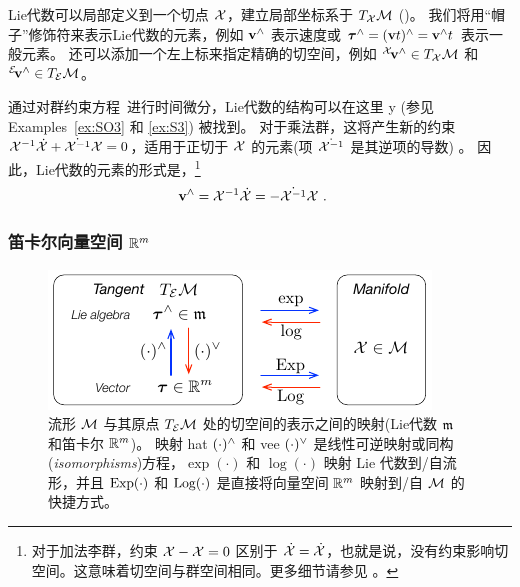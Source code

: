 Lie代数可以局部定义到一个切点 $\mathcal{X}$，建立局部坐标系于 $T_{\mathcal{X}}{\mathcal{M}}$
()。
我们将用“帽子”修饰符来表示Lie代数的元素，例如 ${\bf v}^\wedge$ 表示速度或 ${\bm \tau}^\wedge=({\bf v} t)^\wedge={\bf v}^\wedge t$ 表示一般元素。
还可以添加一个左上标来指定精确的切空间，例如 ${^{\mathcal{X}}}\!{\bf v}^\wedge\in T_{\mathcal{X}}{\mathcal{M}}$ 和 ${^{\mathcal{E}}}\!{\bf v}^\wedge\in T_{\mathcal{E}}{\mathcal{M}}$。



通过对群约束方程~进行时间微分，Lie代数的结构可以在这里%
%
\if \examples y (参见 Examples~\ref{ex:SO3} 和 \ref{ex:S3}) \else \fi 
%
被找到。
对于乘法群，这将产生新的约束 $\mathcal{X}^{-1}\dot{\mathcal{X}} + \dot{\mathcal{X}^{-1}}\mathcal{X} = 0$，适用于正切于 $\mathcal{X}$ 的元素(项 $\dot{\mathcal{X}^{-1}}$ 是其逆项的导数) 。
因此，Lie代数的元素的形式是，\footnote{对于加法李群，约束 $\mathcal{X}-\mathcal{X}=0$ 区别于 $\dot{\mathcal{X}}=\dot{\mathcal{X}}$，也就是说，没有约束影响切空间。这意味着切空间与群空间相同。更多细节请参见  。}
%
\begin{align}\label{equ:tangent_structure}
{\bf v}^\wedge = \mathcal{X}^{-1}\dot{\mathcal{X}} &= -\dot{\mathcal{X}^{-1}}\mathcal{X}
~.
\end{align}
%



\subsubsection[The Cartesian vector space]{笛卡尔向量空间 ${\mathbb R}^m$}

\begin{figure}[tb]
\centering
\includegraphics{figures/maps}
\caption{流形 $\mathcal{M}$ 与其原点 $T_{\mathcal{E}}{\mathcal{M}}$ 处的切空间的表示之间的映射(Lie代数 $\frak{m}$ 和笛卡尔 ${\mathbb R}^m$)。
映射 hat $(\cdot)^\wedge$ 和 vee $(\cdot)^\vee$ 是线性可逆映射或同构(\emph{isomorphisms})方程，$\exp(\cdot)$ 和 $\log(\cdot)$ 映射 Lie 代数到/自流形，并且 $\operatorname*{Exp}(\cdot)$ 和 $\operatorname*{Log}(\cdot)$ 是直接将向量空间 ${\mathbb R}^m$ 映射到/自 $\mathcal{M}$ 的快捷方式。}%
\label{fig:maps}%
\end{figure}%


